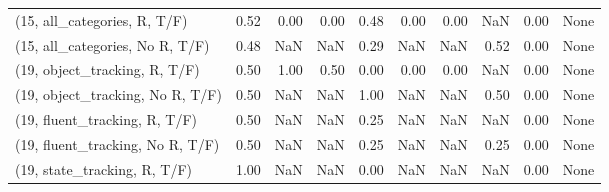 \begin{table*}[h!]
\begin{adjustbox}{width=2\columnwidth,center}
\begin{tabular}{lrrr|rrr|rrr}
(15, all\_categories, R, T/F)          &                      0.52 &                  0.00 &                      0.00 &                          0.48 &                      0.00 &                          0.00 &                                    NaN &                               0.00 &                                  None \\
(15, all\_categories, No R, T/F)       &                      0.48 &                   NaN &                       NaN &                          0.29 &                       NaN &                           NaN &                                   0.52 &                               0.00 &                                  None \\



\midrule
(19, object\_tracking, R, T/F)         &                      0.50 &                  1.00 &                      0.50 &                          0.00 &                      0.00 &                          0.00 &                                    NaN &                               0.00 &                                  None \\
(19, object\_tracking, No R, T/F)      &                      0.50 &                   NaN &                       NaN &                          1.00 &                       NaN &                           NaN &                                   0.50 &                               0.00 &                                  None \\
(19, fluent\_tracking, R, T/F)         &                      0.50 &                   NaN &                       NaN &                          0.25 &                       NaN &                           NaN &                                    NaN &                               0.00 &                                  None \\
(19, fluent\_tracking, No R, T/F)      &                      0.50 &                   NaN &                       NaN &                          0.25 &                       NaN &                           NaN &                                   0.25 &                               0.00 &                                  None \\
(19, state\_tracking, R, T/F)          &                      1.00 &                   NaN &                       NaN &                          0.00 &                       NaN &                           NaN &                                    NaN &                               0.00 &                                  None \\

\end{tabular}
\end{adjustbox}
\end{table*}
